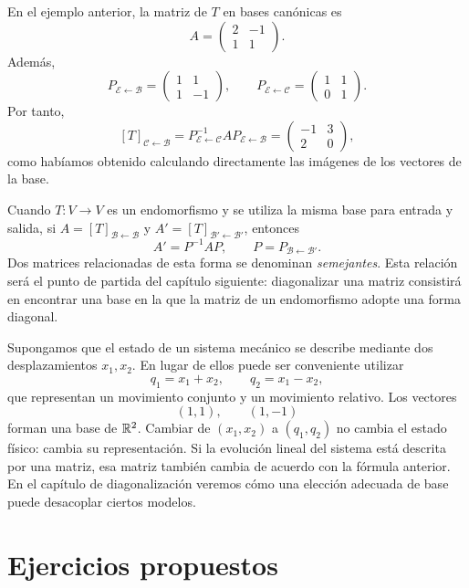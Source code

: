 \begin{example}
En el ejemplo anterior, la matriz de $T$ en bases canónicas es
\[
A=
\begin{pmatrix}
2&-1\\
1&1
\end{pmatrix}.
\]
Además,
\[
P_{\mathcal E\leftarrow\mathcal B}
=
\begin{pmatrix}
1&1\\
1&-1
\end{pmatrix},
\qquad
P_{\mathcal E\leftarrow\mathcal C}
=
\begin{pmatrix}
1&1\\
0&1
\end{pmatrix}.
\]
Por tanto,
\[
[T]_{\mathcal C\leftarrow\mathcal B}
=
P_{\mathcal E\leftarrow\mathcal C}^{-1}
A
P_{\mathcal E\leftarrow\mathcal B}
=
\begin{pmatrix}
-1&3\\
2&0
\end{pmatrix},
\]
como habíamos obtenido calculando directamente las imágenes de los vectores de la base.
\end{example}

Cuando $T:V\to V$ es un endomorfismo y se utiliza la misma base para entrada y salida, si $A=[T]_{\mathcal B\leftarrow\mathcal B}$ y $A'=[T]_{\mathcal B'\leftarrow\mathcal B'}$, entonces
\[
\boxed{
A'=P^{-1}AP,
\qquad
P=P_{\mathcal B\leftarrow\mathcal B'}.
}
\]
Dos matrices relacionadas de esta forma se denominan \emph{semejantes}. Esta relación será el punto de partida del capítulo siguiente: diagonalizar una matriz consistirá en encontrar una base en la que la matriz de un endomorfismo adopte una forma diagonal.

\begin{example}
Supongamos que el estado de un sistema mecánico se describe mediante dos desplazamientos $x_1,x_2$. En lugar de ellos puede ser conveniente utilizar
\[
q_1=x_1+x_2,
\qquad
q_2=x_1-x_2,
\]
que representan un movimiento conjunto y un movimiento relativo. Los vectores
\[
(1,1),\qquad(1,-1)
\]
forman una base de $\mathbb{R}^2$. Cambiar de $(x_1,x_2)$ a $(q_1,q_2)$ no cambia el estado físico: cambia su representación. Si la evolución lineal del sistema está descrita por una matriz, esa matriz también cambia de acuerdo con la fórmula anterior. En el capítulo de diagonalización veremos cómo una elección adecuada de base puede desacoplar ciertos modelos.
\end{example}

\section*{Ejercicios propuestos}
\label{sec:ejercicios-t6}

